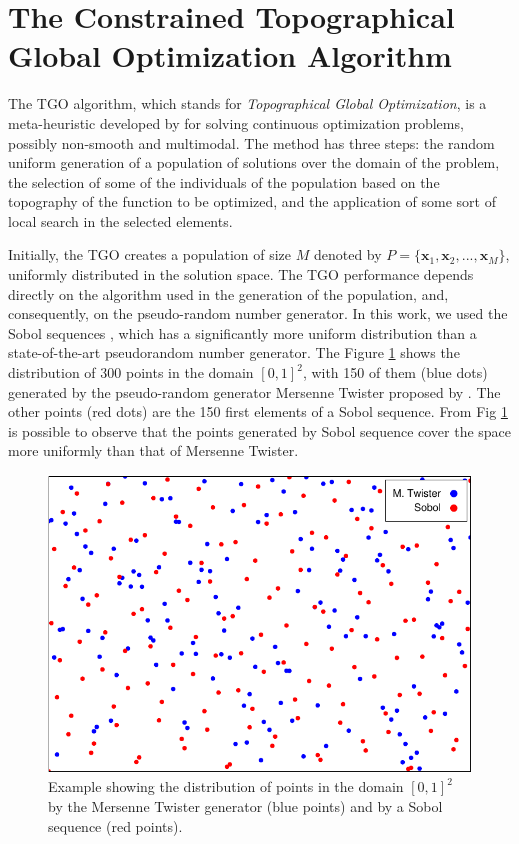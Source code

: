 \section{The Constrained Topographical Global Optimization Algorithm}\label{sec:Methods}

The TGO algorithm, which stands for \textit{Topographical Global Optimization}, is a meta-heuristic developed by \cite{ITGO1} for solving continuous optimization problems, possibly non-smooth and multimodal. The method has three steps: the random uniform generation of a population of solutions over the domain of the problem, the selection of some of the individuals of the population based on the topography of the function to be optimized, and the application of some sort of local search in the selected elements.


Initially, the TGO creates a population of size $M$ denoted by $P = \{\bm{x}_1, \bm{x}_2, ..., \allowbreak \bm{x}_M\}$, uniformly distributed in the solution space. The TGO performance depends directly on the algorithm used in the generation of the population, and, consequently, on the pseudo-random number generator. In this work, we used the Sobol sequences \citep{Sobol, ITGO3}, which has a significantly more uniform distribution than a state-of-the-art pseudorandom number generator. The Figure \ref{fig:Sobol} shows the distribution of 300 points in the domain $[0, 1]^2$, with 150 of them (blue dots) generated by the pseudo-random generator Mersenne Twister proposed by \cite{mt19937}. The other points (red dots) are the 150 first elements of a Sobol sequence. From Fig \ref{fig:Sobol} is possible to observe that the points generated by Sobol sequence cover the space more uniformly than that of Mersenne Twister.


\begin{figure}[h]
\begin{center}
\includegraphics[scale=0.8]{scatter-crop.pdf}
\end{center}
\captionsetup{justification=centering}
\caption{Example showing the distribution of points in the domain $[0, 1]^2$ by the Mersenne Twister generator (blue points) and by a Sobol sequence (red points). }\label{fig:Sobol}
\end{figure}


